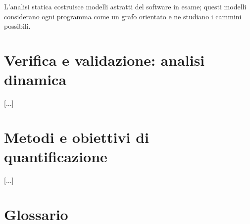 \documentclass[a4paper]{article}
\begin{document}
		
L'analisi statica costruisce modelli astratti del software in esame; questi modelli considerano ogni programma come un grafo orientato e ne studiano i cammini possibili.
	


		
	\section{Verifica e validazione: analisi dinamica}


		[...]
	


		
	\section{Metodi e obiettivi di quantificazione}


		[...]
	


		
	\newpage
	\appendix
	\section{Glossario}
\end{document}
